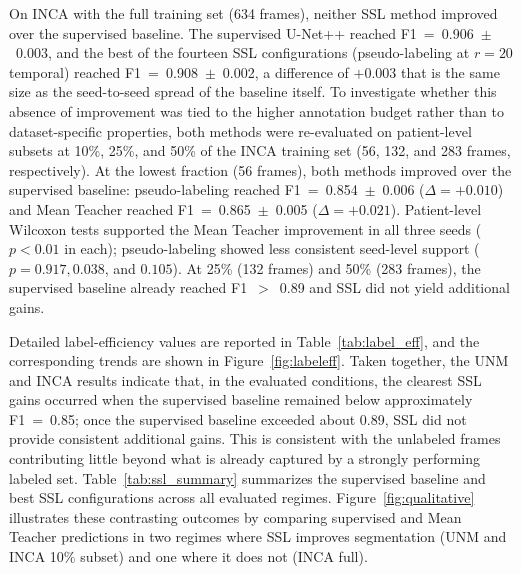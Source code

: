 \documentclass[
  msc,
  american
]{ThesisPUC_v2}
\begin{document}
On INCA with the full training set (634 frames), neither SSL method improved over the supervised baseline. The supervised U-Net++ reached F1~=~0.906~$\pm$~0.003, and the best of the fourteen SSL configurations (pseudo-labeling at $r=20$ temporal) reached F1~=~0.908~$\pm$~0.002, a difference of $+$0.003 that is the same size as the seed-to-seed spread of the baseline itself. To investigate whether this absence of improvement was tied to the higher annotation budget rather than to dataset-specific properties, both methods were re-evaluated on patient-level subsets at 10\%, 25\%, and 50\% of the INCA training set (56, 132, and 283 frames, respectively). At the lowest fraction (56 frames), both methods improved over the supervised baseline: pseudo-labeling reached F1~=~0.854~$\pm$~0.006 ($\Delta=+0.010$) and Mean Teacher reached F1~=~0.865~$\pm$~0.005 ($\Delta=+0.021$). Patient-level Wilcoxon tests supported the Mean Teacher improvement in all three seeds ($p<0.01$ in each); pseudo-labeling showed less consistent seed-level support ($p=0.917, 0.038$, and $0.105$). At 25\% (132 frames) and 50\% (283 frames), the supervised baseline already reached F1~$>$~0.89 and SSL did not yield additional gains.

Detailed label-efficiency values are reported in Table~\ref{tab:label_eff}, and the corresponding trends are shown in Figure~\ref{fig:labeleff}. Taken together, the UNM and INCA results indicate that, in the evaluated conditions, the clearest SSL gains occurred when the supervised baseline remained below approximately F1~=~0.85; once the supervised baseline exceeded about 0.89, SSL did not provide consistent additional gains. This is consistent with the unlabeled frames contributing little beyond what is already captured by a strongly performing labeled set. Table~\ref{tab:ssl_summary} summarizes the supervised baseline and best SSL configurations across all evaluated regimes. Figure~\ref{fig:qualitative} illustrates these contrasting outcomes by comparing supervised and Mean Teacher predictions in two regimes where SSL improves segmentation (UNM and INCA 10\% subset) and one where it does not (INCA full).
\end{document}
